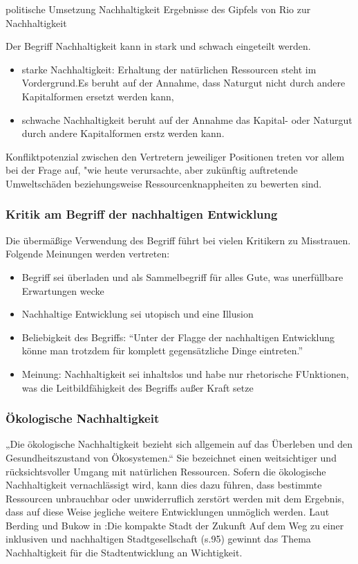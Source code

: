 \documentclass{article}
\begin{document}
politische Umsetzung Nachhaltigkeit
Ergebnisse des Gipfels von Rio zur Nachhaltigkeit




Der Begriff Nachhaltigkeit kann in stark und schwach eingeteilt werden.\cite{Nachhaltigkeit}


\begin{itemize}
\item starke Nachhaltigkeit: Erhaltung der natürlichen Ressourcen steht im Vordergrund.Es beruht auf der Annahme, dass Naturgut nicht durch andere Kapitalformen ersetzt werden kann,
\item schwache Nachhaltigkeit beruht auf der Annahme das Kapital- oder Naturgut durch andere Kapitalformen erstz werden kann.
\end{itemize}
Konfliktpotenzial zwischen den Vertretern jeweiliger Positionen treten vor allem bei der Frage auf, "wie heute verursachte, aber zukünftig auftretende Umweltschäden beziehungsweise Ressourcenknappheiten zu bewerten sind.\cite{NachhaltigeBrockhaus.de}

\subsubsection{Kritik am Begriff der nachhaltigen Entwicklung}\cite{NachhaltigeBrockhaus.de}
Die übermäßige Verwendung des Begriff führt bei vielen Kritikern zu Misstrauen. Folgende Meinungen werden vertreten:

\begin{itemize}
\item Begriff sei überladen und als Sammelbegriff für alles Gute, was unerfüllbare Erwartungen wecke
\item Nachhaltige Entwicklung sei utopisch und eine Illusion
\item Beliebigkeit des Begriffs: “Unter der Flagge der nachhaltigen Entwicklung könne man trotzdem für komplett gegensätzliche Dinge eintreten.”
\item Meinung: Nachhaltigkeit sei inhaltslos und habe nur rhetorische FUnktionen, was die Leitbildfähigkeit des Begriffs außer Kraft setze
\end{itemize}

\subsubsection{Ökologische Nachhaltigkeit}
„Die ökologische Nachhaltigkeit bezieht sich allgemein auf das Überleben und den Gesundheitszustand von Ökosystemen.“ \cite{DefinitionWirtschaftslexikonc}  Sie bezeichnet einen weitsichtiger und rücksichtsvoller Umgang mit natürlichen Ressourcen. Sofern die ökologische Nachhaltigkeit vernachlässigt wird, kann dies dazu führen, dass bestimmte Ressourcen unbrauchbar oder unwiderruflich zerstört werden mit dem Ergebnis, dass auf diese Weise jegliche weitere Entwicklungen unmöglich werden. Laut Berding und Bukow in :Die kompakte Stadt der Zukunft Auf dem Weg zu einer inklusiven und nachhaltigen Stadtgesellschaft (s.95) \cite{BerdingWolf-DietrichBukowKarinCudakHrsgDieStadtgesellschaft} gewinnt das Thema Nachhaltigkeit für die Stadtentwicklung an Wichtigkeit. 
\end{document}
